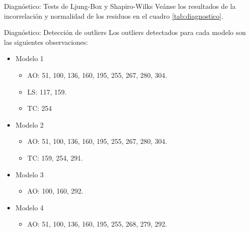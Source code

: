 \documentclass[
  ignorenonframetext,
]{beamer}
\providecommand{\tightlist}{%
  \setlength{\itemsep}{0pt}\setlength{\parskip}{0pt}}
\begin{document}
\begin{frame}{Diagnóstico: Tests de Ljung-Box y Shapiro-Wilks}
\protect\hypertarget{diagnuxf3stico-tests-de-ljung-box-y-shapiro-wilks}{}
Veánse los resultados de la incorrelación y normalidad de los residuos
en el cuadro \ref{tab:diagnostico}.

\begin{table}[H]
\centering
{}
\caption{Diagnostico de modelos SARIMA.}
\label{tab:diagnostico}
\end{table}
\end{frame}

\begin{frame}{Diagnóstico: Detección de outliers}
\protect\hypertarget{diagnuxf3stico-detecciuxf3n-de-outliers}{}
Los outliers detectados para cada modelo son las siguientes
observaciones:

\begin{itemize}
\tightlist
\item
  Modelo 1

  \begin{itemize}
  \tightlist
  \item
    AO: 51, 100, 136, 160, 195, 255, 267, 280, 304.
  \item
    LS: 117, 159.
  \item
    TC: 254
  \end{itemize}
\item
  Modelo 2

  \begin{itemize}
  \tightlist
  \item
    AO: 51, 100, 136, 160, 195, 255, 267, 280, 304.
  \item
    TC: 159, 254, 291.
  \end{itemize}
\item
  Modelo 3

  \begin{itemize}
  \tightlist
  \item
    AO: 100, 160, 292.
  \end{itemize}
\item
  Modelo 4

  \begin{itemize}
  \tightlist
  \item
    AO: 51, 100, 136, 160, 195, 255, 268, 279, 292.
  \end{itemize}
\end{itemize}
\end{frame}
\end{document}
